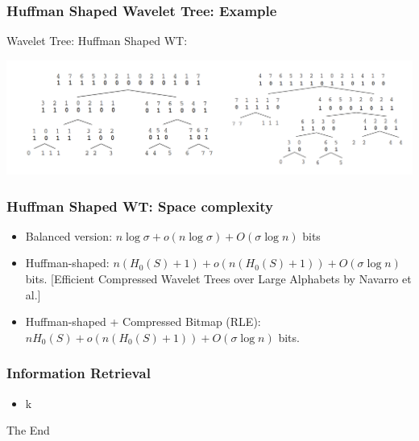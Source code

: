 \documentclass{beamer}
\begin{document}
\begin{frame}
\frametitle{Huffman Shaped Wavelet Tree: Example}
\hspace*{2cm}Wavelet Tree: \hspace{3cm} Huffman Shaped WT:
\begin{center}
	\center \includegraphics[width=1.0\textwidth]{Huffman-shaped-wavelet-tree}
\end{center}
\end{frame}

\begin{frame}
\frametitle{Huffman Shaped WT: Space complexity}
\begin{itemize}
\item Balanced version: $n \log \sigma + o(n \log\sigma) + O(\sigma \log n)$ bits
\item Huffman-shaped: $n(H_0(S) + 1) + o(n(H_0(S) + 1)) + O(\sigma \log n)$ bits. [Efficient Compressed Wavelet Trees over Large Alphabets by Navarro et al.]
\item Huffman-shaped + Compressed Bitmap (RLE): $nH_0(S) + o(n(H_0(S) + 1)) + O(\sigma \log n)$ bits.

\end{itemize}
\end{frame}


\begin{frame}
\frametitle{Information Retrieval}
\begin{itemize}
\item k
\end{itemize}
\end{frame}


\begin{frame}
\Huge{\centerline{The End}}
\end{frame}

\end{document}
